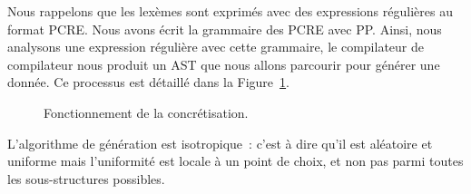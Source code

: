 Nous rappelons que les lexèmes sont exprimés avec des expressions régulières au
format PCRE. Nous avons écrit la grammaire des PCRE avec PP. Ainsi, nous
analysons une expression régulière avec cette grammaire, le compilateur de
compilateur nous produit un AST que nous allons parcourir pour générer une
donnée. Ce processus est détaillé dans la Figure~\ref{figure:data:regex}.
%
\begin{figure}


\caption{\label{figure:data:regex} Fonctionnement de la concrétisation.}

\end{figure}
%
L'algorithme de génération est isotropique~: c'est à dire qu'il est aléatoire et
uniforme mais l'uniformité est locale à un point de choix, et non pas parmi
toutes les sous-structures possibles.

